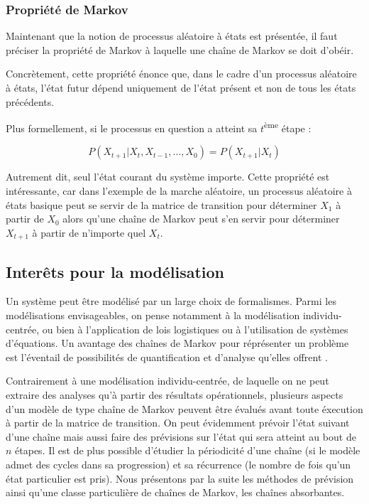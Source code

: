 \documentclass[12pt]{article}
\begin{document}
\subsubsection{Propriété de Markov}

Maintenant que la notion de processus aléatoire à états est présentée,
il faut préciser la propriété de Markov à laquelle une chaîne de
Markov se doit d'obéir.

Concrètement, cette propriété énonce que, dans le cadre d'un processus
aléatoire à états, l'état futur dépend uniquement de l'état présent et
non de tous les états précédents.

Plus formellement, si le processus en question a atteint sa
$t$\textsuperscript{ème} étape :

$$
P(X_{t+1} | X_{t}, X_{t-1}, \dots, X_0) = P(X_{t+1} | X_t)
$$

Autrement dit, seul l'état courant du système importe. Cette propriété
est intéressante, car dans l'exemple de la marche aléatoire, un
processus aléatoire à états basique peut se servir de la matrice de
transition pour déterminer $X_1$ à partir de $X_0$ alors qu'une chaîne
de Markov peut s'en servir pour déterminer $X_{t+1}$ à partir de
n'importe quel $X_t$.

\subsection{Interêts pour la modélisation}

Un système peut être modélisé par un large choix de formalismes. Parmi
les modélisations envisageables, on pense notamment à la modélisation
individu-centrée, ou bien à l'application de lois logistiques ou à
l'utilisation de systèmes d'équations. Un avantage des chaînes de
Markov pour réprésenter un problème est l'éventail de possibilités de
quantification et d'analyse qu'elles offrent \cite{izq}.

Contrairement à une modélisation individu-centrée, de laquelle on ne
peut extraire des analyses qu'à partir des résultats opérationnels,
plusieurs aspects d'un modèle de type chaîne de Markov peuvent être
évalués avant toute éxecution à partir de la matrice de transition. On
peut évidemment prévoir l'état suivant d'une chaîne mais aussi faire
des prévisions sur l'état qui sera atteint au bout de $n$ étapes. Il
est de plus possible d'étudier la périodicité d'une chaîne (si le
modèle admet des cycles dans sa progression) et sa récurrence (le
nombre de fois qu'un état particulier est pris). Nous présentons par
la suite les méthodes de prévision ainsi qu'une classe particulière de
chaînes de Markov, les chaînes absorbantes.
\end{document}
